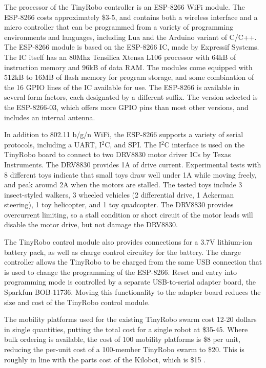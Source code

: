 \documentclass[]{article}
\begin{document}
The processor of the TinyRobo controller is an ESP-8266 WiFi module.
The ESP-8266 costs approximately \$3-5, and contains both a wireless interface and a micro controller that can be programmed from a variety of programming environments and languages, including Lua and the Arduino variant of C/C++. The ESP-8266 module is based on the ESP-8266 IC, made by Expressif Systems. The IC itself has an 80Mhz Tensilica Xtensa L106 processor with 64kB of instruction memory and 96kB of data RAM. The modules come equipped with 512kB to 16MB of flash memory for program storage, and some combination of the 16 GPIO lines of the IC available for use. 
The ESP-8266 is available in several form factors, each designated by a different suffix. 
The version selected is the ESP-8266-03, which offers more GPIO pins than most other versions, and includes an internal antenna.

In addition to 802.11 b/g/n WiFi, the ESP-8266 supports a variety of serial protocols, including a UART, I$^2$C, and SPI. 
The I$^2$C interface is used on the TinyRobo board to connect to two DRV8830 motor driver ICs by Texas Instruments. 
The DRV8830 provides 1A of drive current.
Experimental tests with 8 different toys indicate that small toys draw well under 1A while moving freely, and peak around 2A when the motors are stalled. 
The tested toys include 3 insect-styled walkers, 3 wheeled vehicles (2 differential drive, 1 Ackerman steering), 1 toy helicopter, and 1 toy quadcopter.
The DRV8830 provides overcurrent limiting, so a stall condition or short circuit of the motor leads will disable the motor drive, but not damage the DRV8830. 

The TinyRobo control module also provides connections for a 3.7V lithium-ion battery pack, as well as charge control circuitry for the battery. 
The charge controller allows the TinyRobo to be charged from the same USB connection that is used to change the programming of the ESP-8266. 
Reset and entry into programming mode is controlled by a separate USB-to-serial adapter board, the Sparkfun BOB-11736.
Moving this functionality to the adapter board reduces the size and cost of the TinyRobo control module. 

The mobility platforms used for the existing TinyRobo swarm cost 12-20 dollars in single quantities, putting the total cost for a single robot at \$35-45.
Where bulk ordering is available, the cost of 100 mobility platforms is \$8 per unit, reducing the per-unit cost of a 100-member TinyRobo swarm to \$20. 
This is roughly in line with the parts cost of the Kilobot, which is \$15 \cite{rubenstein2014kilobot}.
\end{document}
